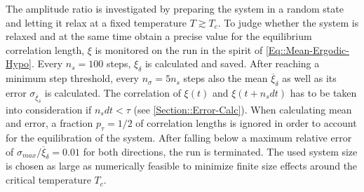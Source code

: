 	The amplitude ratio is investigated by preparing the system in a random state and letting it relax at a fixed temperature $T \gtrsim T_c$. To judge whether the system is relaxed and at the same time obtain a precise value for the equilibrium correlation length, $\xi$ is monitored on the run in the spirit of \autoref{Eq::Mean-Ergodic-Hypo}. Every $n_s =100$ steps, $\xi_\delta$ is calculated and saved. After reaching a minimum step threshold, every $n_\sigma =	5 n_s$ steps also the mean $\overline{\xi}_\delta$ as well as its error $\sigma_{\overline{\xi}_\delta}$ is calculated. The correlation of $\xi(t)$ and $\xi(t + n_s dt)$ has to be taken into consideration if $n_s dt< \tau$ (see \autoref{Section::Error-Calc}). When calculating mean and error, a fraction $p_\tau =	1 /	2$ of correlation lengths is ignored in order to account for the equilibration of the system. After falling below a maximum relative error of $\sigma_{max} /	\overline{\xi}_\delta =	0.01$ for both directions, the run is terminated. The used system size is chosen as large as numerically feasible to minimize finite size effects around the critical temperature $T_c$. \\
